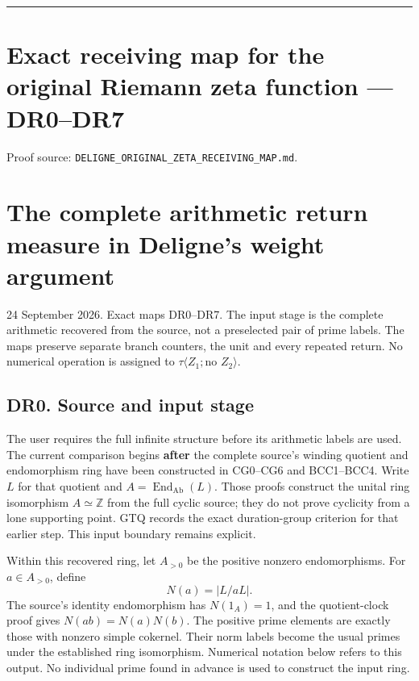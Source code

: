 \documentclass[
]{report}
\begin{document}
\begin{center}\rule{0.5\linewidth}{0.5pt}\end{center}

\chapter{Exact receiving map for the original Riemann zeta function ---
DR0--DR7}\label{exact-receiving-map-for-the-original-riemann-zeta-function-dr0dr7}

Proof source: \nolinkurl{DELIGNE_ORIGINAL_ZETA_RECEIVING_MAP.md}.

\chapter{The complete arithmetic return measure in Deligne's weight
argument}\label{the-complete-arithmetic-return-measure-in-delignes-weight-argument}

24 September 2026. Exact maps DR0--DR7. The input stage is the complete
arithmetic recovered from the source, not a preselected pair of prime
labels. The maps preserve separate branch counters, the unit and every
repeated return. No numerical operation is assigned to
\(\tau\langle Z_1;\text{no }Z_2\rangle\).

\section{DR0. Source and input stage}\label{dr0.-source-and-input-stage}

The user requires the full infinite structure before its arithmetic
labels are used. The current comparison begins \textbf{after} the
complete source's winding quotient and endomorphism ring have been
constructed in CG0--CG6 and BCC1--BCC4. Write \(L\) for that quotient
and \(A=\operatorname{End}_{\mathrm{Ab}}(L)\). Those proofs construct
the unital ring isomorphism \(A\simeq\mathbb Z\) from the full cyclic
source; they do not prove cyclicity from a lone supporting point. GTQ
records the exact duration-group criterion for that earlier step. This
input boundary remains explicit.

Within this recovered ring, let \(A_{>0}\) be the positive nonzero
endomorphisms. For \(a\in A_{>0}\), define \[
N(a)=|L/aL|.
\tag{DR0.1}
\] The source's identity endomorphism has \(N(1_A)=1\), and the
quotient-clock proof gives \(N(ab)=N(a)N(b)\). The positive prime
elements are exactly those with nonzero simple cokernel. Their norm
labels become the usual primes under the established ring isomorphism.
Numerical notation below refers to this output. No individual prime
found in advance is used to construct the input ring.
\end{document}
